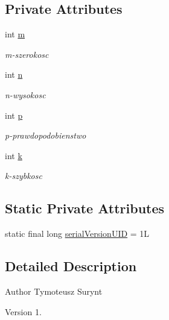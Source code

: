 \subsection*{Private Attributes}
\begin{DoxyCompactItemize}
\item 
int \hyperlink{class_zadanie7_1_1_okno_pierwsze_a8166de2f991b42c6eeebab44994e4305}{m}
\begin{DoxyCompactList}\small\item\em m-\/szerokosc \end{DoxyCompactList}\item 
int \hyperlink{class_zadanie7_1_1_okno_pierwsze_a4288fe2e8591c765e47e1396ee3ced8b}{n}
\begin{DoxyCompactList}\small\item\em n-\/wysokosc \end{DoxyCompactList}\item 
int \hyperlink{class_zadanie7_1_1_okno_pierwsze_a8f557e11c9083055333d31756f24e947}{p}
\begin{DoxyCompactList}\small\item\em p-\/prawdopodobienstwo \end{DoxyCompactList}\item 
int \hyperlink{class_zadanie7_1_1_okno_pierwsze_a90bcf5ebef62537bc74e27078a4f994b}{k}
\begin{DoxyCompactList}\small\item\em k-\/szybkosc \end{DoxyCompactList}\end{DoxyCompactItemize}
\subsection*{Static Private Attributes}
\begin{DoxyCompactItemize}
\item 
static final long \hyperlink{class_zadanie7_1_1_okno_pierwsze_ae27befaff5c47b70ff18a4e7ef92f4e0}{serial\+Version\+U\+ID} = 1L
\end{DoxyCompactItemize}


\subsection{Detailed Description}
\begin{DoxyAuthor}{Author}
Tymoteusz Surynt 
\end{DoxyAuthor}
\begin{DoxyVersion}{Version}
1. 
\end{DoxyVersion}


